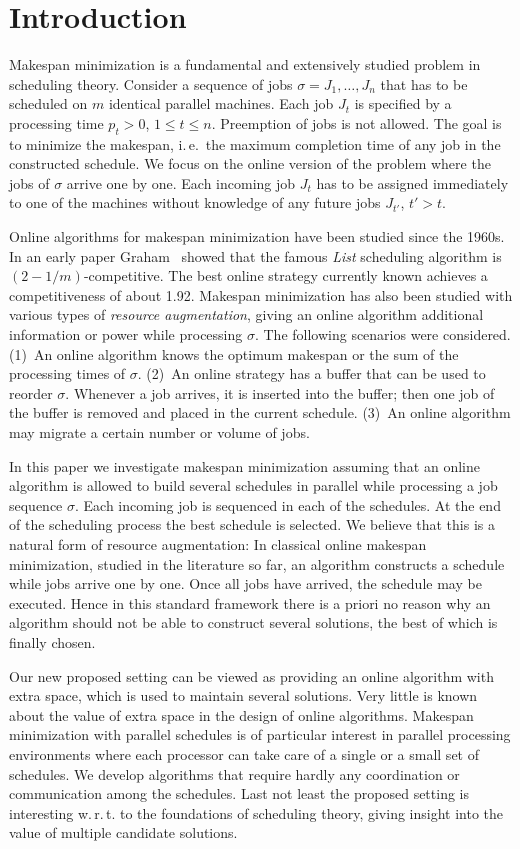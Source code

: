 \documentclass{llncs}
\begin{document}
\section{Introduction}
Makespan minimization is a fundamental and extensively studied problem in scheduling theory. Consider a
sequence of jobs $\sigma = J_1, \ldots, J_n$ that has to be scheduled on $m$ identical parallel
machines. Each job $J_t$ is specified by a processing time $p_t>0$, $1\leq t \leq n$. Preemption of 
jobs is not allowed. The goal is to minimize the makespan, i.\,e.\ the maximum completion time of
any job in the constructed schedule. We focus on the online version of the problem where the jobs
of $\sigma$ arrive one by one. Each incoming job $J_t$ has to be assigned immediately 
to one of the machines without knowledge of any future jobs $J_{t'}$, $t'>t$.

Online algorithms for makespan minimization have been studied since the 1960s. In an early paper
Graham~\cite{G} showed that the famous {\em List\/} scheduling algorithm is $(2-1/m)$-competitive.
The best online strategy currently known achieves a competitiveness of about 1.92. Makespan minimization 
has also been studied with various types of {\em resource augmentation\/}, giving an online algorithm  
additional information or power while processing $\sigma$. The following scenarios were considered.
(1)~An online algorithm knows the optimum makespan or the sum of the processing times of $\sigma$.
(2)~An online strategy has a buffer that can be used to reorder $\sigma$. Whenever a job arrives, it
is inserted into the buffer; then one job of the buffer is removed and placed in the current schedule. 
(3)~An online algorithm may migrate a certain number or volume of jobs. 

In this paper we investigate makespan minimization assuming that an online algorithm is allowed to
build several schedules in parallel while processing a job sequence $\sigma$. Each incoming job is
sequenced in each of the schedules. At the end of the scheduling process the best schedule is selected. 
We believe that this is a natural form of resource augmentation: In classical online makespan minimization, 
studied in the literature so far, an algorithm constructs a schedule while jobs arrive one by one. 
Once all jobs have arrived, the schedule may be executed. 
Hence in this standard framework there is a priori no reason why an algorithm should not be 
able to construct several solutions, the best of which is finally chosen. 

Our new proposed setting can be viewed
as providing an online algorithm with extra space, which is used to maintain several 
solutions. Very little is known about the value of 
extra space in the design of online algorithms. Makespan minimization with parallel schedules
is of particular interest in parallel processing environments where each processor can take care of
a single or a small set of schedules. We develop algorithms that require hardly any coordination 
or communication among the schedules. Last not least the proposed setting is interesting
w.\,r.\,t. to the foundations of scheduling theory, giving insight into the value of multiple
candidate solutions.
\end{document}
